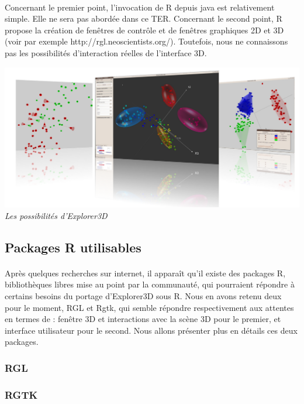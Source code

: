 \paragraph{}
Concernant le premier point, l'invocation de R depuis java est relativement simple. Elle ne sera pas
abordée dans ce TER. Concernant le second point, R propose la création de fenêtres de contrôle et
de fenêtres graphiques 2D et 3D (voir par exemple http://rgl.neoscientists.org/). Toutefois, nous ne
connaissons pas les possibilités d'interaction réelles de l'interface 3D.

\begin{center}
\includegraphics[scale=0.3]{explorer.png}\\
\textit{Les possibilités d'Explorer3D}
\end{center}


\newpage
\subsection{Packages R utilisables}
\paragraph{} Après quelques recherches sur internet, il apparaît qu'il existe des packages R, bibliothèques libres mise au point par la communauté, qui pourraient répondre à certains besoins du portage d'Explorer3D sous R. Nous en avons retenu deux pour le moment, RGL et Rgtk, qui semble répondre respectivement aux attentes en termes de : fenêtre 3D et interactions avec la scène 3D pour le premier, et interface utilisateur pour le second. Nous allons présenter plus en détails ces deux packages.
\subsubsection{RGL}

\newpage
\subsubsection{RGTK}

\newpage